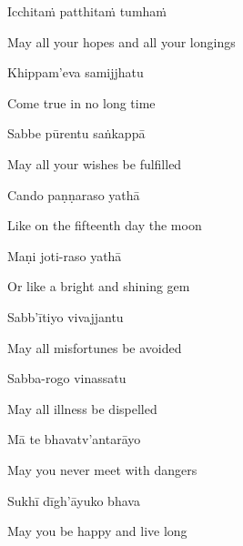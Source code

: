 \suttaRef{[Kp 7]}

Icchitaṁ patthitaṁ tumhaṁ

\begin{english}
  May all your hopes and all your longings
\end{english}

Khippam'eva samijjhatu

\begin{english}
  Come true in no long time
\end{english}

Sabbe pūrentu saṅkappā

\begin{english}
  May all your wishes be fulfilled
\end{english}

Cando paṇṇaraso yathā

\begin{english}
  Like on the fifteenth day the moon
\end{english}

\ifninebythirteen\clearpage\fi

Maṇi joti-raso yathā

\begin{english}
  Or like a bright and shining gem\\
\end{english}

\suttaRef{[Dhp A]}

Sabb'ītiyo vivajjantu

\begin{english}
  May all misfortunes be avoided
\end{english}

Sabba-rogo vinassatu

\begin{english}
  May all illness be dispelled
\end{english}

\ifafive
  \clearpage
\fi

\ifbfive
  \clearpage
\fi

Mā te bhavatv'antarāyo

\begin{english}
  May you never meet with dangers
\end{english}

Sukhī dīgh'āyuko bhava

\begin{english}
  May you be happy and live long
\end{english}

